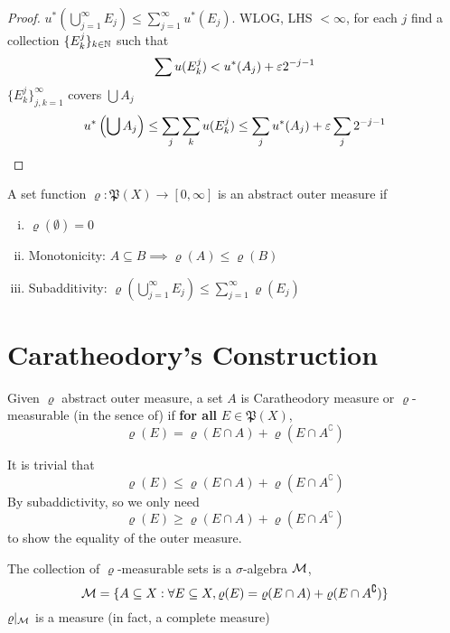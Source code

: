 \begin{proof}
  $u^*(\bigcup_{j=1}^\infty E_j) \le \sum_{j=1}^\infty u^*(E_j)$.
  WLOG, LHS $< \infty$, for each $j$ find a collection $\{E_k^j\}_{k \in \mathbb N}$ such that
  \[\sum u(E_k^j) < u^*(A_j) + \varepsilon 2^{-j-1}\]
  $\{E_k^j\}_{j, k=1}^\infty$ covers $\bigcup A_j$
  \[u^*\left(\bigcup A_j\right)\le \sum_j\sum_k u(E_k^j) \le \sum_j u^*(A_j) + \varepsilon \sum_j {2^{-j-1}}\]
\end{proof}

\begin{definition}
  A set function $\varrho: \mathfrak{P}(X) \to [0, \infty]$ is an abstract outer measure if 
  \begin{enumerate}[(i)]
    \item $\varrho(\emptyset) = 0$
    \item Monotonicity: $A \subseteq B \implies \varrho(A) \le \varrho(B)$
    \item Subadditivity: $\varrho\left(\bigcup_{j=1}^\infty E_j\right) \le \sum_{j=1}^\infty \varrho(E_j)$
  \end{enumerate}
\end{definition}

\section{Caratheodory's Construction}

\begin{definition}
  Given $\varrho$ abstract outer measure,
  a set $A$ is Caratheodory measure or $\varrho$-measurable (in the sence of) 
  if \textbf{for all} $E \in \mathfrak{P}(X)$, 
  \[\varrho(E) = \varrho(E \cap A) + \varrho(E\cap A^\complement)\]
\end{definition}

\begin{remark}
  It is trivial that 
  \[\varrho(E) \le \varrho(E \cap A) + \varrho(E \cap A^\complement)\] 
  By subaddictivity, so we only need 
  \[\varrho(E) \ge \varrho(E \cap A) + \varrho(E \cap A^\complement)\] 
  to show the equality of the outer measure.
\end{remark}

\begin{theorem}
  The collection of $\varrho$-measurable sets is a $\sigma$-algebra $\mathcal M$,
  \[\mathcal M = \{A \subseteq X : \forall E \subseteq X, \varrho(E) = \varrho(E\cap A) + \varrho(E \cap A^\complement)\}\]
  $\varrho|_\mathcal M$
  is a measure (in fact, a complete measure)
\end{theorem}

